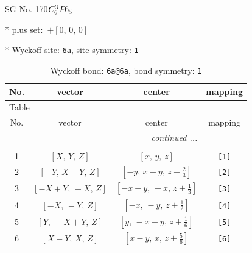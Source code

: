 \documentclass[fleqn,8pt]{jsarticle}
\begin{document}
\setcounter{MaxMatrixCols}{32}

\renewcommand{\tablename}{Table~}
\renewcommand{\figurename}{Figure~}
\begin{center}
\LARGE
SG No. 170\quad$C_{\rm 6}^{3}$\quad$P6_5$\quad[ hexagonal ]
\end{center}

* plus set:\,\,\,$+\left[ 0,\, 0,\, 0 \right]$


* Wyckoff site: {\tt 6a}, site symmetry: {\tt 1}
\renewcommand{\arraystretch}{1.2}
\begin{longtable}{cccc}
\caption{Wyckoff bond: {\tt 6a@6a}, bond symmetry: {\tt 1}}
 \\
 \hline \hline
No. & vector & center & mapping \\ \hline \endfirsthead

\multicolumn{3}{l}{\tablename\ \thetable{}} \\
 \hline \hline
No. & vector & center & mapping \\ \hline \endhead

 \hline \hline
\multicolumn{3}{r}{\footnotesize\it continued ...} \\ \endfoot

 \hline \hline
\multicolumn{3}{r}{} \\ \endlastfoot

1 & $\left[ X,\, Y,\, Z \right]$ & $\left[ x,\, y,\, z \right]$ & {\tt [1]} \\ \hline
2 & $\left[ - Y,\, X - Y,\, Z \right]$ & $\left[ - y,\, x - y,\, z + \frac{2}{3} \right]$ & {\tt [2]} \\ \hline
3 & $\left[ - X + Y,\, - X,\, Z \right]$ & $\left[ - x + y,\, - x,\, z + \frac{1}{3} \right]$ & {\tt [3]} \\ \hline
4 & $\left[ - X,\, - Y,\, Z \right]$ & $\left[ - x,\, - y,\, z + \frac{1}{2} \right]$ & {\tt [4]} \\ \hline
5 & $\left[ Y,\, - X + Y,\, Z \right]$ & $\left[ y,\, - x + y,\, z + \frac{1}{6} \right]$ & {\tt [5]} \\ \hline
6 & $\left[ X - Y,\, X,\, Z \right]$ & $\left[ x - y,\, x,\, z + \frac{5}{6} \right]$ & {\tt [6]} \\
\end{longtable}
\end{document}

